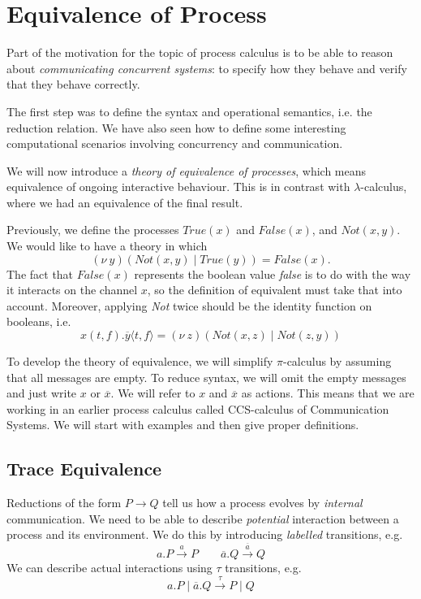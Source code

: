 \documentclass[a4paper, openany]{memoir}
\theoremstyle{definition}
\begin{document}
    \section{Equivalence of Process}
    Part of the motivation for the topic of process calculus is to be able to reason about \emph{communicating concurrent systems}: to specify how they behave and verify that they behave correctly.

    The first step was to define the syntax and operational semantics, i.e. the reduction relation. We have also seen how to define some interesting computational scenarios involving concurrency and communication.

    We will now introduce a \emph{theory of equivalence of processes}, which means equivalence of ongoing interactive behaviour. This is in contrast with $\lambda$-calculus, where we had an equivalence of the final result.

    Previously, we define the processes $\textit{True}(x)$ and $\textit{False}(x)$, and $\textit{Not}(x, y)$. We would like to have a theory in which
    \[(\nu \ y)(\textit{Not}(x, y) \mid \textit{True}(y)) = \textit{False}(x).\]
    The fact that $\textit{False}(x)$ represents the boolean value \textit{false} is to do with the way it interacts on the channel $x$, so the definition of equivalent must take that into account. Moreover, applying \textit{Not} twice should be the identity function on booleans, i.e.
    \[x(t, f).\overline{y} \langle t, f \rangle = (\nu \ z)(\textit{Not}(x, z) \mid \textit{Not}(z, y))\]

    To develop the theory of equivalence, we will simplify $\pi$-calculus by assuming that all messages are empty. To reduce syntax, we will omit the empty messages and just write $x$ or $\overline{x}$. We will refer to $x$ and $\overline{x}$ as actions. This means that we are working in an earlier process calculus called CCS-calculus of Communication Systems. We will start with examples and then give proper definitions.

    \subsection{Trace Equivalence}
    Reductions of the form $P \to Q$ tell us how a process evolves by \emph{internal} communication. We need to be able to describe \emph{potential} interaction between a process and its environment. We do this by introducing \emph{labelled} transitions, e.g.
    \[a.P \xrightarrow{a} P \qquad \overline{a}.Q \xrightarrow{\overline{a}} Q\]
    We can describe actual interactions using $\tau$ transitions, e.g.
    \[a.P \mid \overline{a}.Q \xrightarrow{\tau} P \mid Q\]
\end{document}
